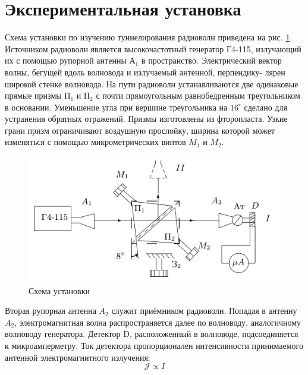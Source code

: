 \documentclass[12pt, a4paper]{article}
\newcommand{\J}{\mathcal{J}}
\begin{document}
\section{Экспериментальная установка}
Схема установки по изучению туннелирования радиоволн приведена на рис. \ref{pic:setup}.
Источником радиоволн является высокочастотный генератор Г4-115, излучающий их с 
помощью рупорной антенны $А_1$ в пространство. Электрический вектор
волны, бегущей вдоль волновода и излучаемый антенной, перпендику-
лярен широкой стенке волновода.
На пути радиоволн устанавливаются две одинаковые прямые призмы $П_1$ и $П_2$ с почти 
прямоугольным равнобедренным треугольником в основании. Уменьшение угла при 
вершине треугольника на $16^\circ$ сделано для устранения обратных отражений. Призмы 
изготовлены из фторопласта. Узкие грани призм ограничивают воздушную прослойку, 
ширина которой может изменяться с помощью микрометрических винтов $M_1$ и $M_2$.
\begin{figure}[H]
  \includegraphics[width=0.8\linewidth]{pics/setup-1.png}
  \caption{Схема установки}
  \label{pic:setup}
\end{figure}
Вторая рупорная антенна $A_2$ служит приёмником радиоволн. Попадая в антенну $A_2$, 
электромагнитная волна распространяется далее по волноводу, аналогичному волноводу 
генератора. Детектор D, расположенный в волноводе, подсоединяется к микроамперметру.
Ток детектора пропорционален интенсивности принимаемого антенной электромагнитного
излучения:
$$\J \propto I$$
\end{document}
